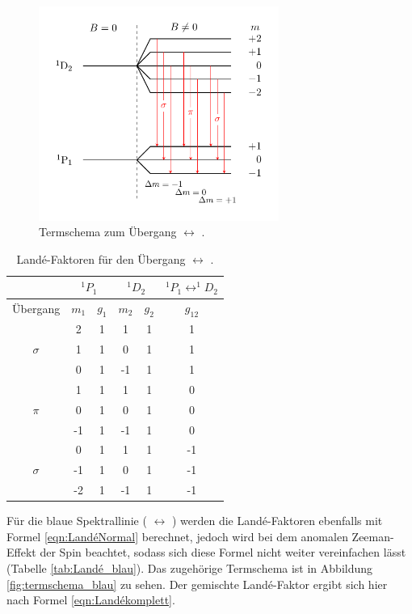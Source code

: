 \begin{figure}
  \centering
  \includegraphics[width=0.7\textwidth]{Pics/termschema_rot.pdf}
  \caption{Termschema zum Übergang  $\leftrightarrow$ 
          \cite{luckyjosh}.}
  \label{fig:TermschemaRot}
\end{figure}

\begin{table}
	\centering
  \caption{Landé-Faktoren für den Übergang  $\leftrightarrow$ .}
	\label{tab:LandéRot}
	\begin{tabular}{cccccc}
		\toprule
		{} & \multicolumn{2}{c}{${}^1P_1$}  & \multicolumn{2}{c}{${}^1D_2$}  & $^1P_1\leftrightarrow ^1\!\!D_2$ \\
		\midrule
		 Übergang &   $m_1$  & $g_{1}$ & $m_2$ & $ g_2$  & $g_{12}$  \\
		\midrule
		& 2 & 1 & 1 & 1 & 1\\
		$\sigma$& 1 & 1 & 0 & 1 & 1\\
		& 0 & 1 & -1 & 1 & 1\\
		\midrule
		& 1 & 1 & 1 & 1 & 0\\
		$\pi$ & 0 & 1 & 0 & 1 & 0\\
		& -1 & 1 & -1 & 1 & 0\\
		\midrule
		& 0 & 1 & 1 & 1 & -1\\
		$\sigma$ & -1 & 1 & 0 & 1 & -1\\
		& -2 & 1 & -1 & 1 & -1\\\bottomrule
	\end{tabular}
\end{table}

Für die blaue Spektrallinie ( $\leftrightarrow$ ) werden die
Landé-Faktoren ebenfalls mit Formel \eqref{eqn:LandéNormal} berechnet, jedoch wird
bei dem anomalen Zeeman-Effekt der Spin beachtet, sodass sich diese Formel nicht
weiter vereinfachen lässt (Tabelle \ref{tab:Landé_blau}). Das zugehörige Termschema
ist in Abbildung \ref{fig:termschema_blau} zu sehen. Der gemischte Landé-Faktor
ergibt sich hier nach Formel \eqref{eqn:Landékomplett}.


